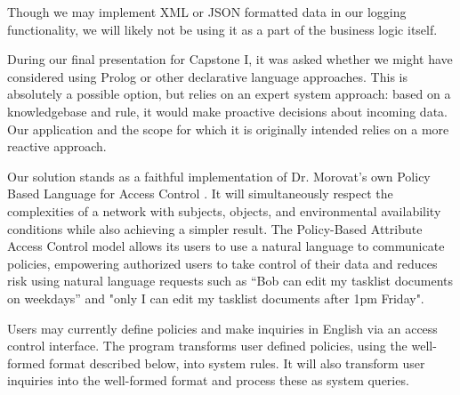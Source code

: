 \documentclass[12pt]{article}
\begin{document}
Though we may implement XML or JSON formatted data in our logging functionality, we will likely not be using it as a part of the business logic itself.

During our final presentation for Capstone I, it was asked whether we might have considered using Prolog or other declarative language approaches. This is absolutely a possible option, but relies on an expert system approach: based on a knowledgebase and rule, it would make proactive decisions about incoming data. Our application and the scope for which it is originally intended relies on a more reactive approach. 

Our solution stands as a faithful implementation of Dr. Morovat's own Policy Based Language for Access Control \cite{morovat16}. It will simultaneously respect the complexities of a network with subjects, objects, and environmental availability conditions while also achieving a simpler result. The Policy-Based Attribute Access Control model allows its users to use a natural language to communicate policies, empowering authorized users to take control of their data and reduces risk using natural language requests such as “Bob can edit my tasklist documents on weekdays” and "only I can edit my tasklist documents after 1pm Friday".

Users may currently define policies and make inquiries in English via an access control interface. The program transforms user defined policies, using the well-formed format described below, into system rules. It will also transform user inquiries into the well-formed format and process these as system queries.
\end{document}
